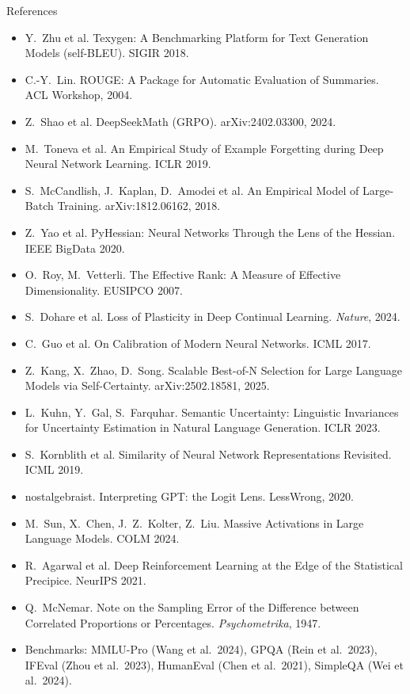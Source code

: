 \documentclass[aspectratio=169,11pt]{beamer}
\begin{document}
\begin{frame}[allowframebreaks]{References}
\begin{itemize}
  \item Y.~Zhu et al. Texygen: A Benchmarking Platform for Text Generation Models (self-BLEU). SIGIR 2018.
  \item C.-Y.~Lin. ROUGE: A Package for Automatic Evaluation of Summaries. ACL Workshop, 2004.
  \item Z.~Shao et al. DeepSeekMath (GRPO). arXiv:2402.03300, 2024.
  \item M.~Toneva et al. An Empirical Study of Example Forgetting during Deep Neural Network Learning. ICLR 2019.
  \item S.~McCandlish, J.~Kaplan, D.~Amodei et al. An Empirical Model of Large-Batch Training. arXiv:1812.06162, 2018.
  \item Z.~Yao et al. PyHessian: Neural Networks Through the Lens of the Hessian. IEEE BigData 2020.
  \item O.~Roy, M.~Vetterli. The Effective Rank: A Measure of Effective Dimensionality. EUSIPCO 2007.
  \item S.~Dohare et al. Loss of Plasticity in Deep Continual Learning. \emph{Nature}, 2024.
  \item C.~Guo et al. On Calibration of Modern Neural Networks. ICML 2017.
  \item Z.~Kang, X.~Zhao, D.~Song. Scalable Best-of-N Selection for Large Language Models via Self-Certainty. arXiv:2502.18581, 2025.
  \item L.~Kuhn, Y.~Gal, S.~Farquhar. Semantic Uncertainty: Linguistic Invariances for Uncertainty Estimation in Natural Language Generation. ICLR 2023.
  \item S.~Kornblith et al. Similarity of Neural Network Representations Revisited. ICML 2019.
  \item nostalgebraist. Interpreting GPT: the Logit Lens. LessWrong, 2020.
  \item M.~Sun, X.~Chen, J.~Z.~Kolter, Z.~Liu. Massive Activations in Large Language Models. COLM 2024.
  \item R.~Agarwal et al. Deep Reinforcement Learning at the Edge of the Statistical Precipice. NeurIPS 2021.
  \item Q.~McNemar. Note on the Sampling Error of the Difference between Correlated Proportions or Percentages. \emph{Psychometrika}, 1947.
  \item Benchmarks: MMLU-Pro (Wang et al.\ 2024), GPQA (Rein et al.\ 2023), IFEval (Zhou et al.\ 2023), HumanEval (Chen et al.\ 2021), SimpleQA (Wei et al.\ 2024).
\end{itemize}
\end{frame}
\end{document}
